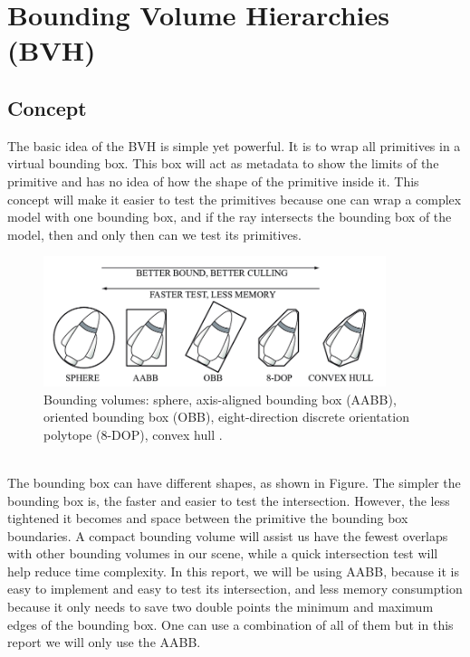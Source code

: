 \documentclass[11pt,a4paper]{article}
\begin{document}
\clearpage

\section{Bounding Volume Hierarchies (BVH)}
\subsection{Concept}
The basic idea of the BVH is simple yet powerful. It is to wrap all primitives in a virtual bounding box. This box will act as metadata to show the limits of the primitive and has no idea of how the shape of the primitive inside it. This concept will make it easier to test the primitives because one can wrap a complex model with one bounding box, and if the ray intersects the bounding box of the model, then and only then can we test its primitives.



\begin{figure}[h]	
     \centering
     \captionsetup{justification=centering,margin=2cm}
     \includegraphics[width=10cm]{images/bvs.png}
     \caption{Bounding volumes: sphere, axis-aligned bounding box (AABB), oriented bounding box (OBB), eight-direction discrete orientation polytope (8-DOP), convex hull . \protect\cite{Ericson2004}}
        \label{fig:dice}
\end{figure}


\noindent
\\
The bounding box can have different shapes, as shown in Figure. The simpler the bounding box is, the faster and easier to test the intersection. However, the less tightened it becomes and space between the primitive the bounding box boundaries. A compact bounding volume will assist us have the fewest overlaps with other bounding volumes in our scene, while a quick intersection test will help reduce time complexity. In this report, we will be using AABB, because it is easy to implement and easy to test its intersection, and less memory consumption because it only needs to save two double points the minimum and maximum edges of the bounding box. One can use a combination of all of them but in this report we will only use the AABB. 
\end{document}

